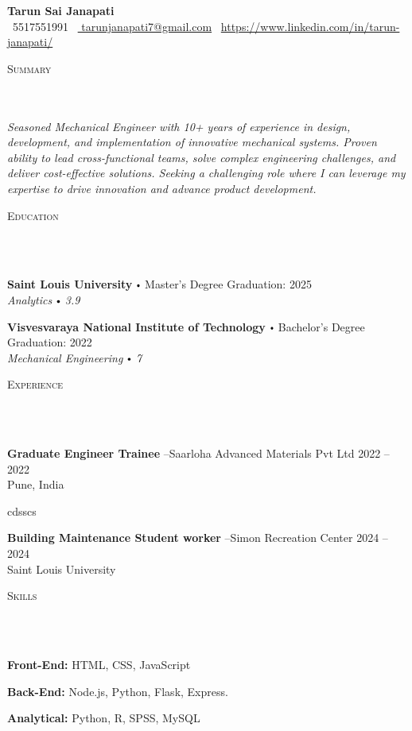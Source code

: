 \documentclass{article}
\newcommand{\school}[4]{
        \textbf{#1} \labelitemi #2 \hfill #3 \\ #4 \vspace*{5pt}
      }
\newcommand{\employer}[4]{{
        \vspace*{2pt}%
        \textbf{#1} #2 \hfill #3\\ #4 \vspace*{2pt}}
        }
\newcommand{\lineunder}{
        \vspace*{-8pt} \\ \hspace*{-18pt} 
        \hrulefill \\
        }
\newcommand{\header}[1]{{
        \hspace*{-15pt}\vspace*{6pt} \textsc{#1}} \vspace*{-6pt} 
        \lineunder
        }
\renewcommand{\labelitemi}{
        $\vcenter{\hbox{\tiny$\bullet$}}$\hspace*{3pt}
        }
\renewcommand{\labelitemii}{
        $\vcenter{\hbox{\tiny$\bullet$}}$\hspace*{-3pt}
        }
\newenvironment{bullet-list-major}{
          \begin{list}{\labelitemii}{\setlength\leftmargin{3pt} 
          \topsep 0pt \itemsep -2pt}}{\vspace*{4pt}\end{list}
          }
\newenvironment{bullet-list-minor}{
          \begin{list}{\labelitemii}{\setlength\leftmargin{15pt} 
            \topsep 0pt \itemsep -2pt}}{\vspace*{4pt}\end{list}
            }
\begin{document}
  
      \small
      \smallskip
      \vspace*{-44pt}
  
      \begin{center}
        {\LARGE \textbf{Tarun Sai Janapati}} \\
        \faPhone\ 5517551991 \quad
        \faEnvelope\ \href{mailto:  tarunjanapati7@gmail.com}{  tarunjanapati7@gmail.com} \quad
        \faLinkedin\ \url{https://www.linkedin.com/in/tarun-janapati/}
      \end{center}
     \vspace*{4pt}%
      \header{Summary}
  
      {
        \textit{ Seasoned Mechanical Engineer with 10+ years of experience in design, development, and implementation of innovative mechanical systems. Proven ability to lead cross-functional teams, solve complex engineering challenges, and deliver cost-effective solutions. Seeking a challenging role where I can leverage my expertise to drive innovation and advance product development.}
        }
  
      \vspace{15pt}
  
     \header{Education}
  
      {
        \school{Saint Louis University}{Master's Degree}{Graduation: 2025}{\textit{Analytics \labelitemi 3.9}}
        

        \school{Visvesvaraya National Institute of Technology}{Bachelor's Degree}{Graduation: 2022}{\textit{Mechanical Engineering \labelitemi 7}}
        }
  
      \vspace*{4pt}%
      \header{Experience}
  
      {
            \employer{Graduate Engineer Trainee}{--Saarloha Advanced Materials Pvt Ltd}{2022 -- 2022}{Pune, India}
            \begin{bullet-list-minor}
                \item cdsscs
            \end{bullet-list-minor}
          

            \employer{Building Maintenance Student worker}{--Simon Recreation Center }{2024 -- 2024}{Saint Louis University }
          }
      \vspace*{4pt}%

      \header{Skills}
      {
        \begin{bullet-list-major}
        \item \textbf{Front-End:} HTML, CSS, JavaScript
        \end{bullet-list-major}
        

        \begin{bullet-list-major}
        \item \textbf{Back-End:} Node.js, Python, Flask, Express.
        \end{bullet-list-major}
        

        \begin{bullet-list-major}
        \item \textbf{Analytical:} Python, R, SPSS, MySQL
        \end{bullet-list-major}
        }
  
\end{document}
